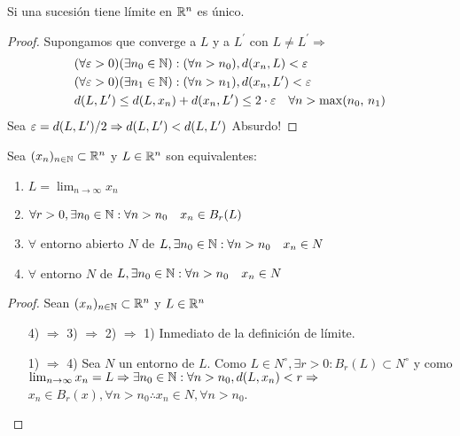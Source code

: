 \begin{lemma}
  Si una sucesión tiene límite en $\mathbb{R}^n$ es único.
  \begin{proof}
    Supongamos que converge a $L$ y a $L^{\prime}$ con $L \neq L^{\prime} \Rightarrow$ \begin{align*}
       & (\forall \varepsilon > 0)(\exists n_0 \in \mathbb{N}) : (\forall n > n_0), d(x_n, L) < \varepsilon                                      \\
       & (\forall \varepsilon > 0)(\exists n_1 \in \mathbb{N}) : (\forall n > n_1), d(x_n, L^{\prime}) < \varepsilon                             \\
       & d(L, L^{\prime}) \leq d(L, x_n) + d(x_n, L^{\prime}) \leq 2 \cdot \varepsilon \quad \forall n > \max(n_0\text{, } n_1)
    \end{align*}
    Sea $\varepsilon = d(L, L^{\prime})/2 \Rightarrow d(L, L^{\prime}) < d(L, L^{\prime})$ Absurdo!
  \end{proof}
\end{lemma}

\begin{prop}
  Sea $(x_n)_{n \in \mathbb{N}} \subset \mathbb{R}^n$ y $L \in \mathbb{R}^n$ son equivalentes:

  \begin{enumerate}
    \item $L = \lim_{n \to \infty} x_n$
    \item $\forall r > 0, \exists n_0 \in \mathbb{N} : \forall n > n_0 \quad x_n \in B_r(L)$
    \item $\forall$ entorno abierto $N$ de $L, \exists n_0 \in \mathbb{N} : \forall n > n_0 \quad x_n \in N$
    \item $\forall$ entorno $N$ de $L, \exists n_0 \in \mathbb{N} : \forall n > n_0 \quad x_n \in N$
  \end{enumerate}
  \begin{proof}
    Sean $(x_n)_{n \in \mathbb{N}} \subset \mathbb{R}^n$ y $L \in \mathbb{R}^n$ \begin{enumerate}
      \item[4) $\Rightarrow$ 3) $\Rightarrow$ 2) $\Rightarrow$ 1)] Inmediato de la definición de límite.
      \item [1) $\Rightarrow$ 4)] Sea $N$ un entorno de $L$. Como $L \in N^{\circ}, \exists r > 0 : B_r(L) \subset N^{\circ}$ y como $\lim_{n \to \infty} x_n = L \Rightarrow \exists n_0 \in \mathbb{N} : \forall n > n_0, d(L, x_n) < r \Rightarrow$ \\
            $x_n \in B_r(x), \forall n > n_0 \therefore x_n \in N, \forall n > n_0$.
    \end{enumerate}
  \end{proof}
\end{prop}

